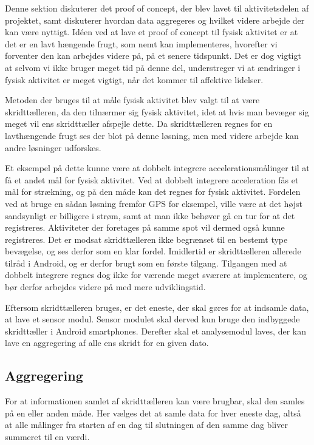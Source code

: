 Denne sektion diskuterer det proof of concept, der blev lavet til aktivitetsdelen af projektet, samt diskuterer hvordan data aggregeres og hvilket videre arbejde der kan være nyttigt. 
Idéen ved at lave et proof of concept til fysisk aktivitet er at det er en lavt hængende frugt, som nemt kan implementeres, hvorefter vi forventer den kan arbejdes videre på, på et senere tidspunkt. 
Det er dog vigtigt at selvom vi ikke bruger meget tid på denne del, understreger vi at ændringer i fysisk aktivitet er meget vigtigt, når det kommer til affektive lidelser. 

Metoden der bruges til at måle fysisk aktivitet blev valgt til at være skridttælleren, da den tilnærmer sig fysisk aktivitet, idet at hvis man bevæger sig meget vil ens skridttæller afspejle dette.
Da skridttælleren regnes for en lavthængende frugt ses der blot på denne løsning, men med videre arbejde kan andre løsninger udforskes.

Et eksempel på dette kunne være at dobbelt integrere accelerationsmålinger til at få et andet mål for fysisk aktivitet.
Ved at dobbelt integrere acceleration fås et mål for strækning, og på den måde kan det regnes for fysisk aktivitet.
Fordelen ved at bruge en sådan løsning fremfor GPS for eksempel, ville være at det højst sandsynligt er billigere i strøm, samt at man ikke behøver gå en tur for at det registreres. Aktiviteter der foretages på samme spot vil dermed også kunne registreres.
Det er modsat skridttælleren ikke begrænset til en bestemt type bevægelse, og ses derfor som en klar fordel.
Imidlertid er skridttælleren allerede tilråd i Android, og er derfor brugt som en første tilgang.
Tilgangen med at dobbelt integrere regnes dog ikke for værende meget sværere at implementere, og bør derfor arbejdes videre på med mere udviklingstid.

Eftersom skridttælleren bruges, er det eneste, der skal gøres for at indsamle data, at lave et sensor modul.
Sensor modulet skal derved kun bruge den indbyggede skridttæller i Android smartphones.
Derefter skal et analysemodul laves, der kan lave en aggregering af alle ens skridt for en given dato.

\subsection{Aggregering}
For at informationen samlet af skridttælleren kan være brugbar, skal den samles på en eller anden måde.
Her vælges det at samle data for hver eneste dag, altså at alle målinger fra starten af en dag til slutningen af den samme dag bliver summeret til en værdi.

